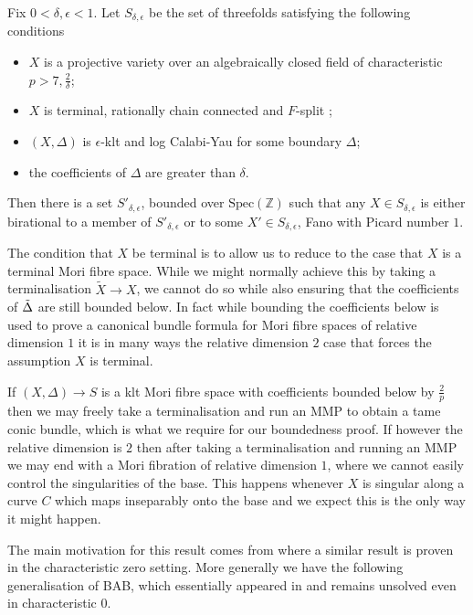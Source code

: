 	\begin{theorem}\label{Main}
		Fix $0 < \delta, \epsilon <1$. Let $S_{\delta,\epsilon}$ be the set of threefolds satisfying the following conditions
		\begin{itemize}
			\item $X$ is a projective variety over an algebraically closed field of characteristic $p >7, \frac{2}{\delta}$;
			\item $X$ is terminal, rationally chain connected and $F$-split ;
			\item $(X,\Delta)$ is $\epsilon$-klt and log Calabi-Yau for some boundary $\Delta$;
			\item the coefficients of $\Delta$ are greater than $\delta$.
		\end{itemize}
		
		Then there is a set $S'_{\delta,\epsilon}$, bounded over $\text{Spec}(\mathbb{Z})$ such that any $X\in S_{\delta,\epsilon}$ is either birational to a member of $S'_{\delta,\epsilon}$ or to some $X'\in S_{\delta,\epsilon}$, Fano with Picard number $1$. 
	\end{theorem}
	\begin{remark}
		The condition that $X$ be terminal is to allow us to reduce to the case that $X$ is a terminal Mori fibre space. While we might normally achieve this by taking a terminalisation $\tilde{X} \to X$, we cannot do so while also ensuring that the coefficients of $\tilde{\Delta}$ are still bounded below. In fact while bounding the coefficients below is used to prove a canonical bundle formula for Mori fibre spaces of relative dimension $1$ it is in many ways the relative dimension $2$ case that forces the assumption $X$ is terminal.
		
		If $(X,\Delta) \to S$ is a klt Mori fibre space with coefficients bounded below by $\frac{2}{p}$ then we may freely take a terminalisation and run an MMP to obtain a tame conic bundle, which is what we require for our boundedness proof. If however the relative dimension is $2$ then after taking a terminalisation and running an MMP we may end with a Mori fibration of relative dimension $1$, where we cannot easily control the singularities of the base. This happens whenever $X$ is singular along a curve $C$ which maps inseparably onto the base and we expect this is the only way it might happen. 
	\end{remark}

	The main motivation for this result comes from \cite{chen2018birational} where a similar result is proven in the characteristic zero setting. More generally we have the following generalisation of BAB, which essentially appeared in \cite{mckernan2003threefold} and remains unsolved even in characteristic $0$. 
	 
